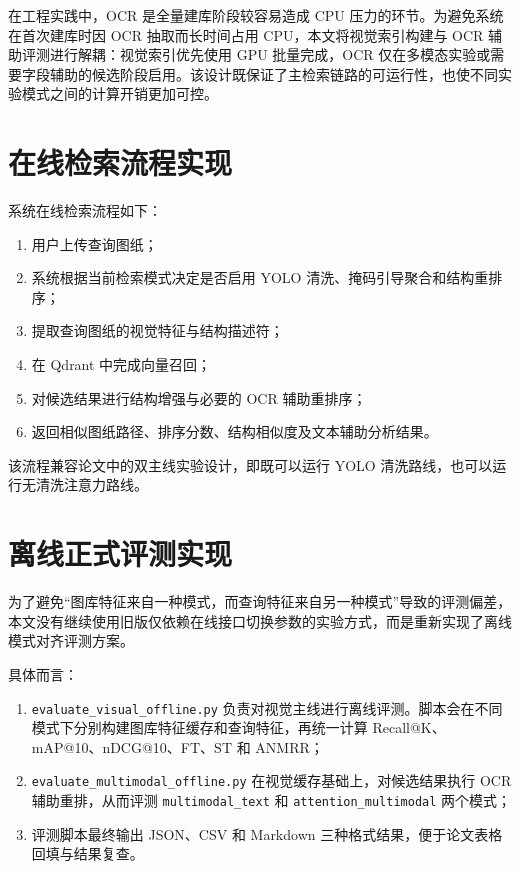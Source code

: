 在工程实践中，OCR 是全量建库阶段较容易造成 CPU 压力的环节。为避免系统在首次建库时因 OCR 抽取而长时间占用 CPU，本文将视觉索引构建与 OCR 辅助评测进行解耦：视觉索引优先使用 GPU 批量完成，OCR 仅在多模态实验或需要字段辅助的候选阶段启用。该设计既保证了主检索链路的可运行性，也使不同实验模式之间的计算开销更加可控。

\section{在线检索流程实现}

系统在线检索流程如下：
\begin{enumerate}
  \item 用户上传查询图纸；
  \item 系统根据当前检索模式决定是否启用 YOLO 清洗、掩码引导聚合和结构重排序；
  \item 提取查询图纸的视觉特征与结构描述符；
  \item 在 Qdrant 中完成向量召回；
  \item 对候选结果进行结构增强与必要的 OCR 辅助重排序；
  \item 返回相似图纸路径、排序分数、结构相似度及文本辅助分析结果。
\end{enumerate}

该流程兼容论文中的双主线实验设计，即既可以运行 YOLO 清洗路线，也可以运行无清洗注意力路线。

\section{离线正式评测实现}

为了避免“图库特征来自一种模式，而查询特征来自另一种模式”导致的评测偏差，本文没有继续使用旧版仅依赖在线接口切换参数的实验方式，而是重新实现了离线模式对齐评测方案。

具体而言：
\begin{enumerate}
  \item \texttt{evaluate\_visual\_offline.py} 负责对视觉主线进行离线评测。脚本会在不同模式下分别构建图库特征缓存和查询特征，再统一计算 Recall@K、mAP@10、nDCG@10、FT、ST 和 ANMRR；
  \item \texttt{evaluate\_multimodal\_offline.py} 在视觉缓存基础上，对候选结果执行 OCR 辅助重排，从而评测 \texttt{multimodal\_text} 和 \texttt{attention\_multimodal} 两个模式；
  \item 评测脚本最终输出 JSON、CSV 和 Markdown 三种格式结果，便于论文表格回填与结果复查。
\end{enumerate}

